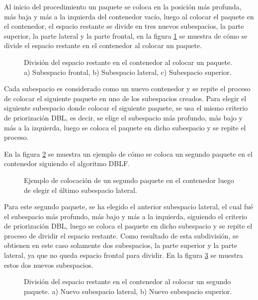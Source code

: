 \documentclass[openany]{article}
\begin{document}
Al inicio del procedimiento un paquete se coloca en la posición más profunda, más baja y más a la izquierda del contenedor vacío, luego al colocar el paquete en el contenedor, el espacio restante se divide en tres nuevos subespacios, la parte superior, la parte lateral y la parte frontal, en la figura \ref{fig:subespacios} se muestra de cómo se divide el espacio restante en el contenedor al colocar un paquete.

\begin{figure}[H]
    \centering
    
    \caption{División del espacio restante en el contenedor al colocar un paquete. a) Subespacio frontal, b) Subespacio lateral, c) Subespacio superior.}
    \label{fig:subespacios}
\end{figure}

Cada subespacio es considerado como un nuevo contenedor y se repite el proceso de colocar el siguiente paquete en uno de los subespacios creados. Para elegir el siguiente subespacio donde colocar el siguiente paquete, se usa el mismo criterio de priorización DBL, es decir, se elige el subespacio más profundo, más bajo y más a la izquierda, luego se coloca el paquete en dicho subespacio y se repite el proceso.

En la figura \ref{fig:segundo_paquete} se muestra un ejemplo de cómo se coloca un segundo paquete en el contenedor siguiendo el algoritmo DBLF.

\begin{figure}[H]
    \centering
    
    \caption{Ejemplo de colocación de un segundo paquete en el contenedor luego de elegir el último subespacio lateral.}
    \label{fig:segundo_paquete}
\end{figure}

Para este segundo paquete, se ha elegido el anterior subespacio lateral, el cual fué el subespacio más profundo, más bajo y más a la izquierda, siguiendo el criterio de priorización DBL, luego se coloca el paquete en dicho subespacio y se repite el proceso de dividir el espacio restante. Como resultado de esta subdivisión, se obtienen en este caso solamente dos subespacios, la parte superior y la parte lateral, ya que no queda espacio frontal para dividir. En la figura \ref{fig:segundos_subespacios} se muestra estos dos nuevos subespacios.

\begin{figure}[H]
    \centering
    
    \caption{División del espacio restante en el contenedor al colocar un segundo paquete. a) Nuevo subespacio lateral, b) Nuevo subespacio superior.}
    \label{fig:segundos_subespacios}
\end{figure}
\end{document}
